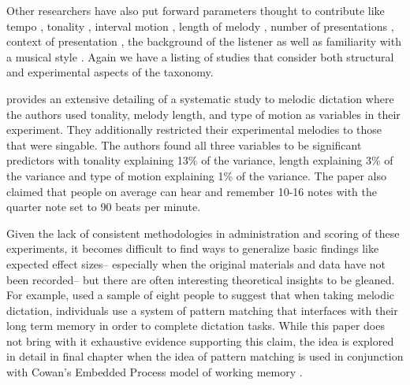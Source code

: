 \documentclass[12pt,]{book}
\begin{document}
Other researchers have also put forward parameters thought to contribute like tempo \citep{hofstetterComputerBaesedRecognitionPerceptual1981}, tonality \citep{dowlingScaleContourTwo1978, longRelationshipsPitchMemory1977, pembrookInterferenceTranscriptionProcess1986, ouraMemoryMelodiesSubjects1988}, interval motion \citep{ortmannTonalDeterminantsMelodic1933, pembrookInterferenceTranscriptionProcess1986}, length of melody \citep{longRelationshipsPitchMemory1977, pembrookInterferenceTranscriptionProcess1986}, number of presentations \citep{hofstetterComputerBaesedRecognitionPerceptual1981, pembrookInterferenceTranscriptionProcess1986},
context of presentation \citep{schellenbergEffectTonalRhythmicContext1985},
the background of the listener \citep{longRelationshipsPitchMemory1977, ouraMemoryMelodiesSubjects1988, schellenbergEffectTonalRhythmicContext1985, taylorStrategiesMemoryShort1983} as well as familiarity with a musical style \citep{schellenbergEffectTonalRhythmicContext1985}.
Again we have a listing of studies that consider both structural and experimental aspects of the taxonomy.

\citet{pembrookInterferenceTranscriptionProcess1986} provides an extensive detailing of a systematic study to melodic dictation where the authors used tonality, melody length, and type of motion as variables in their experiment.
They additionally restricted their experimental melodies to those that were singable.
The authors found all three variables to be significant predictors with tonality explaining 13\% of the variance, length explaining 3\% of the variance and type of motion explaining 1\% of the variance.
The paper also claimed that people on average can hear and remember 10-16 notes with the quarter note set to 90 beats per minute.

Given the lack of consistent methodologies in administration and scoring of these experiments, it becomes difficult to find ways to generalize basic findings like expected effect sizes-- especially when the original materials and data have not been recorded-- but there are often interesting theoretical insights to be gleaned.
For example, \citet{ouraConstructingRepresentationMelody1991a} used a sample of eight people to suggest that when taking melodic dictation, individuals use a system of pattern matching that interfaces with their long term memory in order to complete dictation tasks.
While this paper does not bring with it exhaustive evidence supporting this claim, the idea is explored in detail in final chapter when the idea of pattern matching is used in conjunction with Cowan's Embedded Process model of working memory \citep{cowanEvolvingConceptionsMemory1988}.
\end{document}
